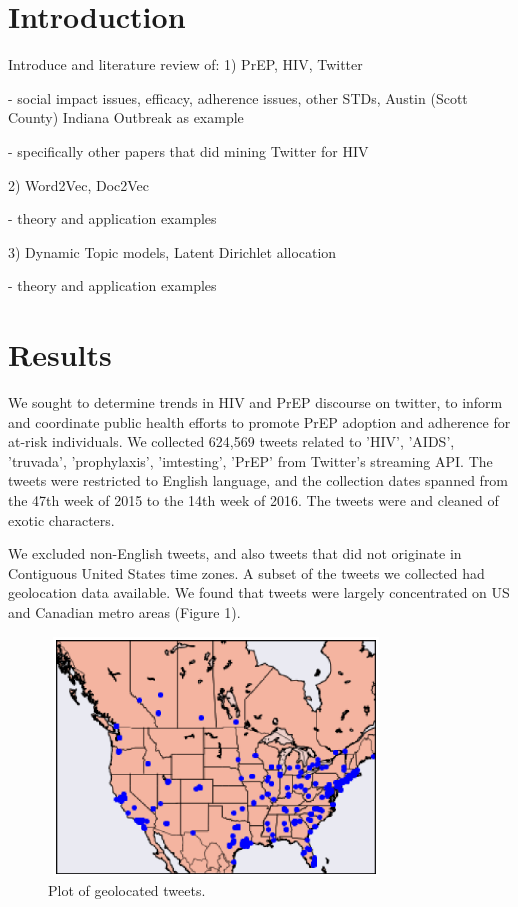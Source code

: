 \documentclass{sig-alternate-05-2015}
\begin{document}
\section{Introduction}

Introduce and literature review of:
1) PrEP, HIV, Twitter

 - social impact issues, efficacy, adherence issues, other STDs, Austin (Scott County) Indiana Outbreak as example
 
 - specifically other papers that did mining Twitter for HIV


2) Word2Vec, Doc2Vec

 - theory and application examples

3) Dynamic Topic models, Latent Dirichlet allocation

- theory and application examples

\section{Results}



We sought to determine trends in HIV and PrEP discourse on twitter, to inform and coordinate public health efforts to promote PrEP adoption and adherence for at-risk individuals. We collected 624,569 tweets related to 'HIV', 'AIDS', 'truvada', 'prophylaxis', 'imtesting', 'PrEP' from Twitter's streaming API. The tweets were restricted to English language, and the collection dates spanned from the 47th week of 2015 to the 14th week of 2016. The tweets were and cleaned of exotic characters.


We excluded non-English tweets, and also tweets that did not originate in Contiguous United States time zones. A subset of the tweets we collected had geolocation data available. We found that tweets were largely concentrated on US and Canadian metro areas (Figure 1).

\begin{figure}
\centering
\includegraphics[height=2.5in, width=3.5in]{map}
\caption{Plot of geolocated tweets.}
\end{figure}
\end{document}
